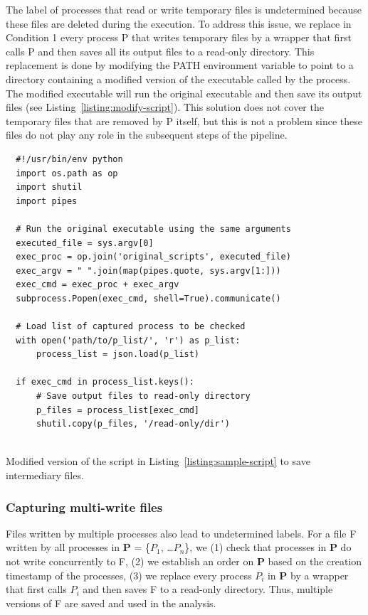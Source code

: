 \documentclass[a4paper,num-refs]{oup-contemporary}
\begin{document}
The label of processes that read or 
write temporary files is undetermined because these files are deleted during 
the execution. To address this issue, we replace in Condition 1 every process P that 
writes temporary files by a wrapper that first calls P and then
saves all its output files to a read-only directory. This replacement is
done by modifying the PATH environment variable to point to a directory
containing a modified version of the executable called by the process. The
modified executable will run the original executable and then save its
output files (see Listing~\ref{listing:modify-script}). 
This 
solution does not cover the temporary files that are removed by P 
itself, but this is not a problem since these files do not play any role in 
the subsequent steps of the pipeline. 

\begin{listing}
  \begin{verbatim}
  #!/usr/bin/env python
  import os.path as op
  import shutil
  import pipes

  # Run the original executable using the same arguments
  executed_file = sys.argv[0]
  exec_proc = op.join('original_scripts', executed_file)
  exec_argv = " ".join(map(pipes.quote, sys.argv[1:]))
  exec_cmd = exec_proc + exec_argv
  subprocess.Popen(exec_cmd, shell=True).communicate()
  
  # Load list of captured process to be checked
  with open('path/to/p_list/', 'r') as p_list:
      process_list = json.load(p_list)

  if exec_cmd in process_list.keys():
      # Save output files to read-only directory
      p_files = process_list[exec_cmd]
      shutil.copy(p_files, '/read-only/dir')
  
  \end{verbatim}
    \caption{Modified version of the script in Listing~\ref{listing:sample-script} to save intermediary files.}
    \label{listing:modify-script}
  \end{listing}

\subsubsection{Capturing multi-write files}

Files written by multiple processes also lead 
to undetermined labels. For a file F 
written by all processes in \textbf{P} = \{$P_{1}$, \ldots $P_{n}$\}, we 
(1) check that processes in \textbf{P} do not write concurrently to F, 
(2) we establish an order on \textbf{P} based on the creation timestamp 
of the processes, (3) we replace every process $P_{i}$ in \textbf{P} by 
a wrapper that first calls $P_{i}$ and then saves F to a read-only 
directory. Thus, multiple versions of F are saved and used in the 
analysis. 
\end{document}
